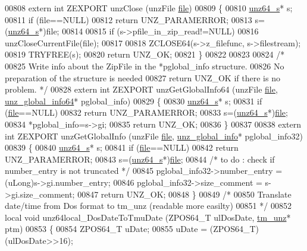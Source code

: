 \begin{DoxyCode}
00808 \textcolor{keyword}{extern} \textcolor{keywordtype}{int} ZEXPORT unzClose (unzFile \hyperlink{structfile}{file})
00809 \{
00810     \hyperlink{structunz64__s}{unz64\_s}* s;
00811     \textcolor{keywordflow}{if} (file==NULL)
00812         \textcolor{keywordflow}{return} UNZ\_PARAMERROR;
00813     s=(\hyperlink{structunz64__s}{unz64\_s}*)file;
00814 
00815     \textcolor{keywordflow}{if} (s->pfile\_in\_zip\_read!=NULL)
00816         unzCloseCurrentFile(file);
00817 
00818     ZCLOSE64(s->z\_filefunc, s->filestream);
00819     TRYFREE(s);
00820     \textcolor{keywordflow}{return} UNZ\_OK;
00821 \}
00822 
00823 
00824 \textcolor{comment}{/*}
00825 \textcolor{comment}{  Write info about the ZipFile in the *pglobal\_info structure.}
00826 \textcolor{comment}{  No preparation of the structure is needed}
00827 \textcolor{comment}{  return UNZ\_OK if there is no problem. */}
00828 \textcolor{keyword}{extern} \textcolor{keywordtype}{int} ZEXPORT unzGetGlobalInfo64 (unzFile \hyperlink{structfile}{file}, \hyperlink{structunz__global__info64__s}{unz\_global\_info64}* pglobal\_info)
00829 \{
00830     \hyperlink{structunz64__s}{unz64\_s}* s;
00831     \textcolor{keywordflow}{if} (\hyperlink{structfile}{file}==NULL)
00832         \textcolor{keywordflow}{return} UNZ\_PARAMERROR;
00833     s=(\hyperlink{structunz64__s}{unz64\_s}*)\hyperlink{structfile}{file};
00834     *pglobal\_info=s->gi;
00835     \textcolor{keywordflow}{return} UNZ\_OK;
00836 \}
00837 
00838 \textcolor{keyword}{extern} \textcolor{keywordtype}{int} ZEXPORT unzGetGlobalInfo (unzFile \hyperlink{structfile}{file}, \hyperlink{structunz__global__info__s}{unz\_global\_info}* pglobal\_info32)
00839 \{
00840     \hyperlink{structunz64__s}{unz64\_s}* s;
00841     \textcolor{keywordflow}{if} (\hyperlink{structfile}{file}==NULL)
00842         \textcolor{keywordflow}{return} UNZ\_PARAMERROR;
00843     s=(\hyperlink{structunz64__s}{unz64\_s}*)\hyperlink{structfile}{file};
00844     \textcolor{comment}{/* to do : check if number\_entry is not truncated */}
00845     pglobal\_info32->number\_entry = (uLong)s->gi.number\_entry;
00846     pglobal\_info32->size\_comment = s->gi.size\_comment;
00847     \textcolor{keywordflow}{return} UNZ\_OK;
00848 \}
00849 \textcolor{comment}{/*}
00850 \textcolor{comment}{   Translate date/time from Dos format to tm\_unz (readable more easilty)}
00851 \textcolor{comment}{*/}
00852 local \textcolor{keywordtype}{void} unz64local\_DosDateToTmuDate (ZPOS64\_T ulDosDate, \hyperlink{structtm__unz__s}{tm\_unz}* ptm)
00853 \{
00854     ZPOS64\_T uDate;
00855     uDate = (ZPOS64\_T)(ulDosDate>>16);

\end{DoxyCode}
